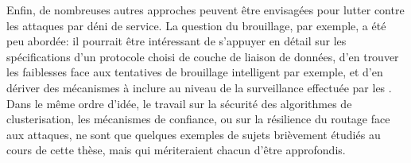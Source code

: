 Enfin, de nombreuses autres approches peuvent être envisagées pour lutter contre les attaques par déni de service.
La question du brouillage, par exemple, a été peu abordée: il pourrait être intéressant de s'appuyer en détail sur les spécifications d'un protocole choisi de couche de liaison de données, d'en trouver les faiblesses face aux tentatives de brouillage intelligent par exemple, et d'en dériver des mécanismes à inclure au niveau de la surveillance effectuée par les \cnst.
Dans le même ordre d'idée, le travail sur la sécurité des algorithmes de clusterisation, les mécanismes de confiance, ou sur la résilience du routage face aux attaques, ne sont que quelques exemples de sujets brièvement étudiés au cours de cette thèse, mais qui mériteraient chacun d'être approfondis.
